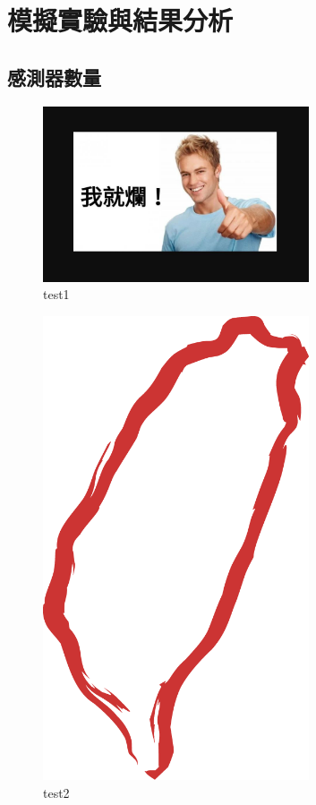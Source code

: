 \chapter{模擬實驗與結果分析}\label{Experimental_results}


\section{感測器數量}


\begin{figure}[H] 
    \centering 
    \includegraphics[width=0.7\textwidth]{./Figures/ImageTest/123.JPG} 
    \caption{test1} 
\end{figure}

\begin{figure}[H] 
    \centering 
    \includegraphics[width=0.7\textwidth]{./Figures/ImageTest/Taiwan_symbol.png} 
    \caption{test2} 
\end{figure}

